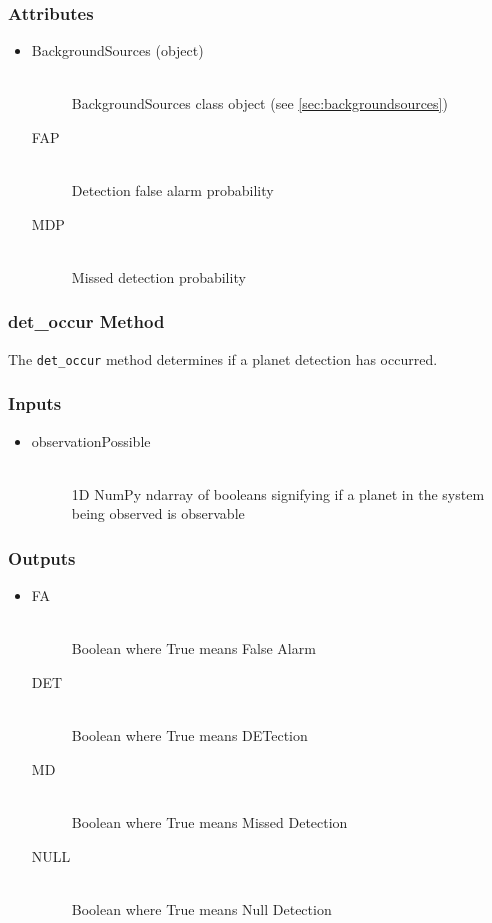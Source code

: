 \documentclass[cleanfoot]{asme2ej}
\begin{document}
\subsubsection*{Attributes}
\begin{itemize}
    \item 
    \begin{description}
        \item[BackgroundSources (object)] \hfill \\
        BackgroundSources class object (see \ref{sec:backgroundsources})
        \item[FAP] \hfill \\
        Detection false alarm probability
        \item[MDP] \hfill \\
        Missed detection probability
    \end{description}
\end{itemize}

\subsubsection{det\_occur Method} \label{sec:detoccurtask}
The \verb+det_occur+ method determines if a planet detection has occurred.

\subsubsection*{Inputs}
\begin{itemize}
    \item 
    \begin{description}
        \item[observationPossible] \hfill \\
        1D NumPy ndarray of booleans signifying if a planet in the system being observed is observable
    \end{description}
\end{itemize}

\subsubsection*{Outputs}
\begin{itemize}
    \item 
    \begin{description}
        \item[FA] \hfill \\
        Boolean where True means False Alarm
        \item[DET] \hfill \\
        Boolean where True means DETection
        \item[MD] \hfill \\
        Boolean where True means Missed Detection
        \item[NULL] \hfill \\
        Boolean where True means Null Detection
    \end{description}
\end{itemize}
\end{document}
